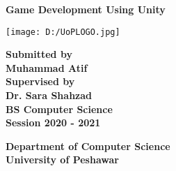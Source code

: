 
	\begin{center}
		
		
		
		{\Large \textbf{Game Development Using Unity}} 
		\vspace{2cm}
		
		
		
		{\texttt{[image: D:/UoPLOGO.jpg]}} 
		
		\vspace{2cm}
		
		{\large \textbf {Submitted by}} \\
		\vspace{0.1cm}
		{\textbf{Muhammad Atif}  }\\
		
		\vspace{2cm}
		{\large\textbf{Supervised by}} \\
		\vspace{0.1cm}
		\textbf{Dr. Sara Shahzad}  \\
		
		\vspace{2cm}
		{\textbf{BS Computer Science}} \\
		\vspace{0.1cm}
		{\textbf{Session 2020 - 2021}}
		
		\vspace{2cm}
		
		{\textbf{Department of Computer Science}}\\
		\vspace{0.1cm}
		{\textbf{University of Peshawar}} 
\thispagestyle{empty}  
	\end{center}
	


